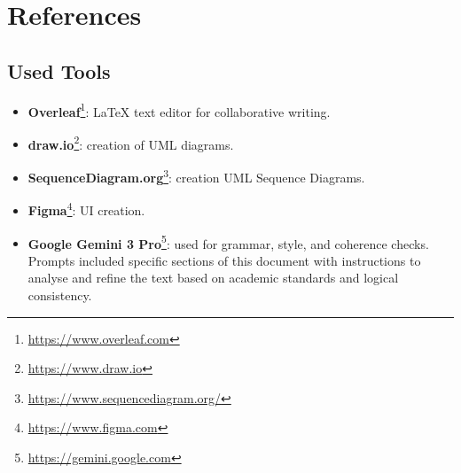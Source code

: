 \chapter{References}
\section{Used Tools}
\begin{itemize}
    \item \textbf{Overleaf}\footnote{\url{https://www.overleaf.com}}: \LaTeX \xspace text editor for collaborative writing.
    \item \textbf{draw.io}\footnote{\url{https://www.draw.io}}: creation of UML diagrams.
    \item \textbf{SequenceDiagram.org}\footnote{\url{https://www.sequencediagram.org/}}: creation UML Sequence Diagrams.
    \item \textbf{Figma}\footnote{\url{https://www.figma.com}}: UI creation.
    \item \textbf{Google Gemini 3 Pro}\footnote{\url{https://gemini.google.com}}: used for grammar, style, and coherence checks. Prompts included specific sections of this document with instructions to analyse and refine the text based on academic standards and logical consistency.
\end{itemize}
